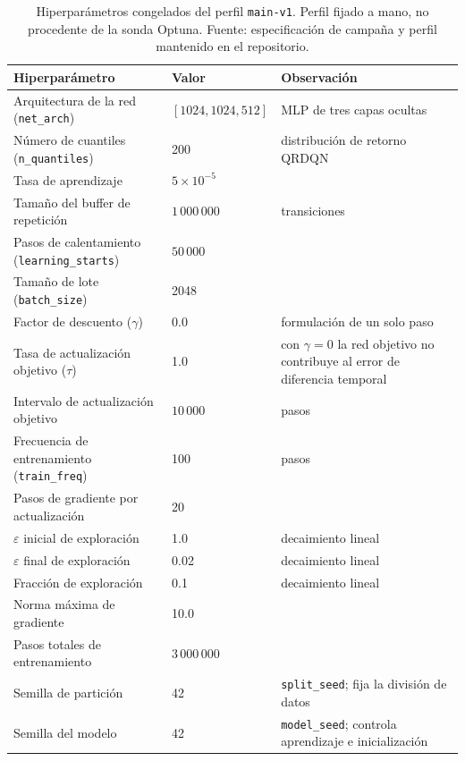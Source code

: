 \begin{table}[htbp]
\centering
\small
\begin{tabular}{p{4.5cm}p{2.8cm}p{4.5cm}}
\toprule
Hiperparámetro & Valor & Observación \\
\midrule
Arquitectura de la red (\texttt{net\_arch}) & $[1024, 1024, 512]$ & MLP de tres capas ocultas \\
Número de cuantiles (\texttt{n\_quantiles}) & 200 & distribución de retorno QRDQN \\
Tasa de aprendizaje & $5\times10^{-5}$ & \\
Tamaño del buffer de repetición & $1\,000\,000$ & transiciones \\
Pasos de calentamiento (\texttt{learning\_starts}) & $50\,000$ & \\
Tamaño de lote (\texttt{batch\_size}) & 2048 & \\
Factor de descuento ($\gamma$) & 0.0 & formulación de un solo paso \\
Tasa de actualización objetivo ($\tau$) & 1.0 & con $\gamma=0$ la red objetivo no contribuye al error de diferencia temporal \\
Intervalo de actualización objetivo & $10\,000$ & pasos \\
Frecuencia de entrenamiento (\texttt{train\_freq}) & 100 & pasos \\
Pasos de gradiente por actualización & 20 & \\
$\varepsilon$ inicial de exploración & 1.0 & decaimiento lineal \\
$\varepsilon$ final de exploración & 0.02 & decaimiento lineal \\
Fracción de exploración & 0.1 & decaimiento lineal \\
Norma máxima de gradiente & 10.0 & \\
Pasos totales de entrenamiento & $3\,000\,000$ & \\
Semilla de partición & 42 & \texttt{split\_seed}; fija la división de datos \\
Semilla del modelo & 42 & \texttt{model\_seed}; controla aprendizaje e inicialización \\
\bottomrule
\end{tabular}
\caption[Hiperparámetros congelados del perfil main-v1]{Hiperparámetros congelados del perfil \texttt{main-v1}. Perfil fijado a mano, no procedente de la sonda Optuna. Fuente: especificación de campaña y perfil mantenido en el repositorio.}
\label{tab:hiperparametros-main}
\end{table}

